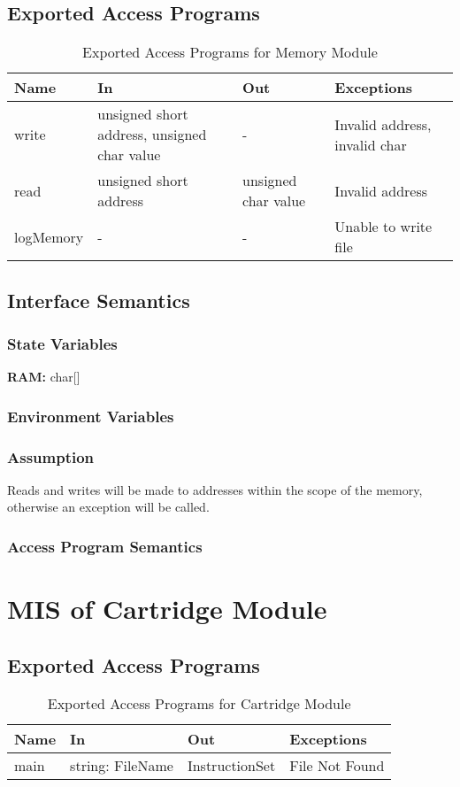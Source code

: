 \documentclass[12pt]{article}
\begin{document}
	\subsection{Exported Access Programs}
		\begin{table}[H]
			\centering
			\begin{tabular}{p{1.5in} p{1.5in} p{1.5in} p{1.5in}}
				\hline
				\textbf{Name} & \textbf{In} & \textbf{Out} & \textbf{Exceptions}\\
				\hline
				write & unsigned short address, unsigned char value & - & Invalid address, invalid char\\
				read & unsigned short address & unsigned char value & Invalid address\\
				logMemory & - & - & Unable to write file\\
			\end{tabular}
			\caption{Exported Access Programs for Memory Module}
		\end{table}
	\subsection{Interface Semantics}
		\subsubsection{State Variables}
			\textbf{RAM: } char[]
		\subsubsection{Environment Variables}
		\subsubsection{Assumption}
			Reads and writes will be made to addresses within the scope of the memory, otherwise an exception will be called.
		\subsubsection{Access Program Semantics}

\section{MIS of Cartridge Module}
	\subsection{Exported Access Programs}
		\begin{table}[H]
			\centering
			\begin{tabular}{p{1.5in} p{1.5in} p{1.5in} p{1.5in}}
				\hline
				\textbf{Name} & \textbf{In} & \textbf{Out} & \textbf{Exceptions}\\
				\hline
				main & string: FileName & InstructionSet & File Not Found
			\end{tabular}
			\caption{Exported Access Programs for Cartridge Module}
		\end{table}
\end{document}
